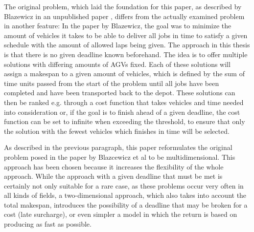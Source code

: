 The original problem, which laid the foundation for this paper, as described by Blazewicz in an unpublished paper \cite{blazewicz198}, differs from the actually examined
problem in another feature: In the paper by Blazewicz, the goal was to minimize the amount of vehicles it takes to be able to
deliver all jobs in time to satisfy a given schedule with the amount of allowed laps being given. The approach in this thesis is that there is no
given deadline known beforehand. The idea is to offer multiple solutions with differing amounts of AGVs fixed. Each of these solutions will assign
a makespan to a given amount of vehicles, which is defined by the sum of time units passed from the start of the problem until all jobs have been
completed and have been transported back to the depot. These solutions can then be ranked e.g. through a cost function that takes vehicles and time needed into consideration or, if the goal is to finish ahead of a given deadline, the cost function
can be set to infinite when exceeding the threshold, to ensure that only the solution with the fewest vehicles which finishes in time will be selected.

As described in the previous paragraph, this paper reformulates the original problem posed in the paper by Blazcewicz et al to be multidimensional. This
approach has been chosen because it increases the flexibility of the whole approach. While the approach with a given deadline that must be met
is certainly not only suitable for a rare case, as these problems occur very often in all kinds of fields, a two-dimensional approach, which also
takes into account the total makespan, introduces the possibility of a deadline that may be broken for a cost (late surcharge), or even simpler a model in
which the return is based on producing as fast as possible.